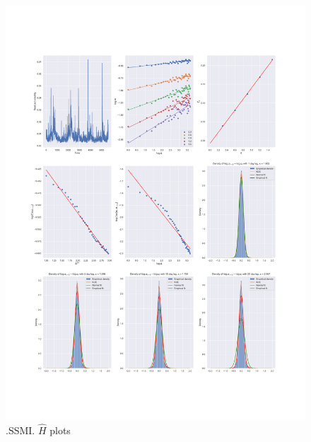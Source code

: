 	\begin{figure}[h]
		\centering
		\includegraphics[width=\linewidth]{fig/.SSMI.pdf}
		\caption{.SSMI. $\hat{H}$ plots}
	\end{figure}

